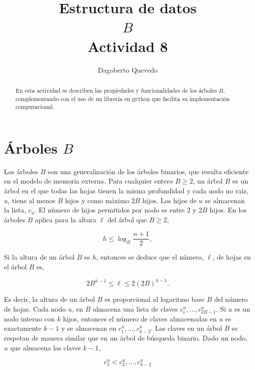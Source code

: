 \documentclass[letterpaper,11pt]{article}
\begin{document}
\title{Estructura de datos\\ $B$\\\small Actividad 8}
\author{Dagoberto Quevedo}
\maketitle

\begin{abstract}
En esta actividad se describen las propiedades y funcionalidades de los árboles $B$, complementando con el uso de un librería en python que facilita su implementación computacional.
\end{abstract}

\section{Árboles $B$}

Los árboles $B$ son una generalización de los árboles binarios, que resulta eficiente en el modelo de memoria externa. Para cualquier entero $B \ge 2$, un árbol $B$ es un árbol en el que todas las hojas tienen la misma profundidad y cada nodo no raíz, $u$, tiene al menos $B$ hijos y como máximo $2B$ hijos. Los hijos de $u$ se almacenan la lista, $c_u$. El número de hijos permitidos por nodo es entre 2 y $ 2B $ hijos. En los árboles $B$ aplica para la altura $\ell$ del árbol que  $B \ge 2$,

\begin{equation}
	h\le \log_{B} \frac{n+1}{2},
\end{equation}

Si la altura de un árbol $B$ es $h$, entonces se deduce que el número, $\ell$, de hojas en el árbol $B$ es,

\begin{equation}
	2B^{h-1}\le \ell \le 2(2B)^{h-1}.
\end{equation}

Es decir, la altura de un árbol $B$ es proporcional al logaritmo base $B$ del número de hojas. Cada nodo $u$, en $ B$  almacena una lista de claves $c^u_i,\dots,c^u_{2B-1}$. Si $u$ es un nodo interno con $k$ hijos, entonces el número de claves almacenadas en $u$ es exactamente $k-1$ y se almacenan en $c^u_1,\dots,c^u_{k-2}$. Las claves en un árbol $B$ se respetan de manera similar que en un árbol de búsqueda binario. Dado un nodo, $u$ que almacena las claves $k-1$,

\begin{equation}
	c^u_1 < c^u_2,\dots,c^u_{k-2}
\end{equation}
\end{document}
